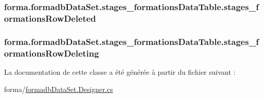 \subsubsection[{\texorpdfstring{stages\+\_\+formations\+Row\+Deleted}{stages_formationsRowDeleted}}]{ forma.\+formadb\+Data\+Set.\+stages\+\_\+formations\+Data\+Table.\+stages\+\_\+formations\+Row\+Deleted}\hypertarget{classforma_1_1formadb_data_set_1_1stages__formations_data_table_adedb4fc467d8fb7aec2ca9ee55ee5e04}{}\label{classforma_1_1formadb_data_set_1_1stages__formations_data_table_adedb4fc467d8fb7aec2ca9ee55ee5e04}
\subsubsection[{\texorpdfstring{stages\+\_\+formations\+Row\+Deleting}{stages_formationsRowDeleting}}]{ forma.\+formadb\+Data\+Set.\+stages\+\_\+formations\+Data\+Table.\+stages\+\_\+formations\+Row\+Deleting}\hypertarget{classforma_1_1formadb_data_set_1_1stages__formations_data_table_ae01b9fbd5638846ea868e7982856f7ac}{}\label{classforma_1_1formadb_data_set_1_1stages__formations_data_table_ae01b9fbd5638846ea868e7982856f7ac}


La documentation de cette classe a été générée à partir du fichier suivant \+:\begin{DoxyCompactItemize}
\item 
forma/\hyperlink{formadb_data_set_8_designer_8cs}{formadb\+Data\+Set.\+Designer.\+cs}\end{DoxyCompactItemize}
